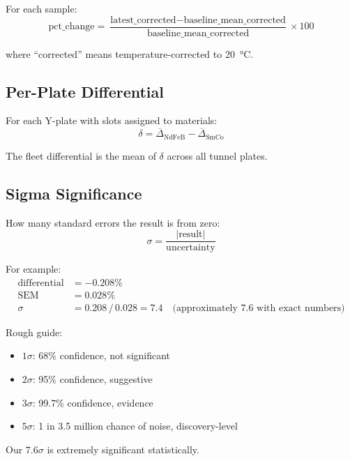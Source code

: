 \documentclass[11pt,letterpaper]{article}
\begin{document}
For each sample:
\begin{equation*}
\text{pct\_change} = \frac{\text{latest\_corrected} - \text{baseline\_mean\_corrected}}
                          {\text{baseline\_mean\_corrected}} \times 100
\end{equation*}

where ``corrected'' means temperature-corrected to \SI{20}{\degreeCelsius}.

\subsection{Per-Plate Differential}

For each Y-plate with slots assigned to materials:
\begin{equation*}
\delta = \overline{\Delta}_{\mathrm{NdFeB}} - \overline{\Delta}_{\mathrm{SmCo}}
\end{equation*}

The fleet differential is the mean of $\delta$ across all tunnel plates.

\subsection{Sigma Significance}

How many standard errors the result is from zero:
\begin{equation*}
\sigma = \frac{|\text{result}|}{\text{uncertainty}}
\end{equation*}

For example:
\begin{align*}
\text{differential} &= -0.208\% \\
\mathrm{SEM} &= 0.028\% \\
\sigma &= 0.208\,/\,0.028 = 7.4 \quad \text{(approximately 7.6 with exact numbers)}
\end{align*}

Rough guide:
\begin{itemize}[nosep]
  \item $1\sigma$: 68\% confidence, not significant
  \item $2\sigma$: 95\% confidence, suggestive
  \item $3\sigma$: 99.7\% confidence, evidence
  \item $5\sigma$: 1 in 3.5 million chance of noise, discovery-level
\end{itemize}

Our $7.6\sigma$ is extremely significant statistically.
\end{document}
